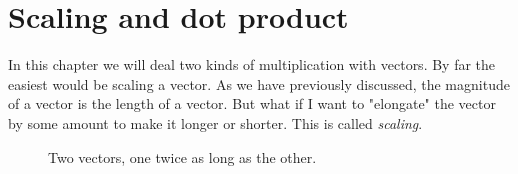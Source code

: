 
\section{Scaling and dot product}
In this chapter we will deal two kinds of multiplication with vectors. By far the easiest would be scaling a vector. As we have previously discussed, the magnitude of a vector is the length of a vector. But what if I want to "elongate" the vector by some amount to make it longer or shorter. This is called \textit{scaling}.
\begin{figure}[h]
  \centering
  \caption{Two vectors, one twice as long as the other.}
  \label{scalevector}
\end{figure}


